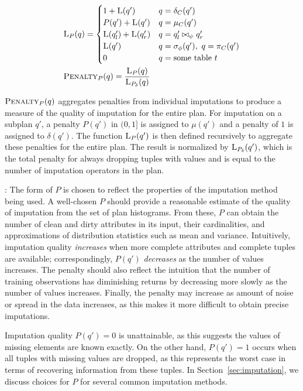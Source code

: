 {\begin{align*}
    &\textsc{L}_{P}(q) = \begin{cases}
     1 + \textsc{L}(q') & q = \delta_C(q') \\
     P(q') + \textsc{L}(q') & q = \mu_C(q') \\
     \textsc{L}(q_l') + \textsc{L}(q_r') & q = q_l' \bowtie_\psi q_r' \\
     \textsc{L}(q') & q = \sigma_\phi(q'),\ q = \pi_C(q') \\
     0 & q = \text{some table } t\\
  \end{cases}\\
    &\textsc{Penalty}_{P}(q) = \frac{\textsc{L}_{P}(q)}{\textsc{L}_{P_\delta}(q)}
\end{align*}

$\textsc{Penalty}_{P}(q)$ aggregates penalties from individual imputations to produce a measure of the quality of imputation for the entire plan.
For imputation on a subplan $q'$, a penalty $P(q')$ in $(0,1]$ is assigned to $\mu(q')$
and a penalty of $1$ is assigned to $\delta(q')$.
The function $\textsc{L}_{P}(q')$ is then defined recursively to aggregate these penalties for the entire plan. 
The result is normalized by $\textsc{L}_{P_\delta}(q')$, which is the total penalty for always dropping tuples with \nullv{} values and is equal to the number of imputation operators in the plan.

: The form of $P$ is chosen to reflect the properties of the imputation method being used.
A well-chosen $P$ should provide a reasonable estimate of the quality of imputation from the set of plan histograms.
From these, $P$ can obtain the number of clean and dirty attributes in its input, their cardinalities, and approximations of distribution statistics such as mean and variance.
Intuitively, imputation quality \textit{increases} when more complete attributes and complete tuples are available; correspondingly, $P(q')$ \textit{decreases} as the number of values increases.
The penalty should also reflect the intuition that the number of training observations has diminishing returns by decreasing more slowly as the number of values increases.
Finally, the penalty may increase as amount of noise or spread in the data increases, as this makes it more difficult to obtain precise imputations.

Imputation quality $P(q')=0$ is unattainable, as this suggests the values of missing elements are known exactly.
On the other hand, $P(q')=1$ occurs when all tuples with missing values are dropped, as this represents the worst case in terms of recovering information from these tuples.
In Section~\ref{sec:imputation}, we discuss choices for $P$ for several common imputation methods.

}
